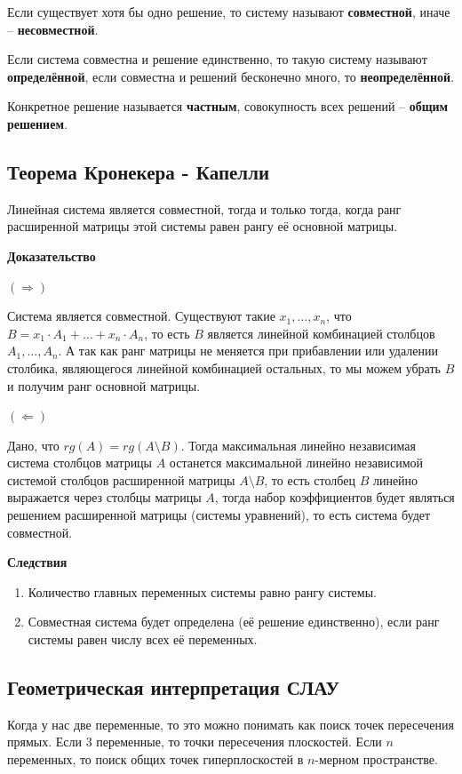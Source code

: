\documentclass{article}
\begin{document}
Если существует хотя бы одно решение, то систему называют \textbf{совместной}, иначе -- \textbf{несовместной}.

Если система совместна и решение единственно, то такую систему называют \textbf{определённой}, если совместна и решений бесконечно много, то \textbf{неопределённой}.

Конкретное решение называется \textbf{частным}, совокупность всех решений -- \textbf{общим решением}.
\newpage
\subsection{Теорема Кронекера - Капелли}
Линейная система является совместной, тогда и только тогда, когда ранг расширенной матрицы этой системы равен рангу её основной матрицы.

\textbf{Доказательство}

$(\Rightarrow)$

Система является совместной. Существуют такие $x_1,\ldots,x_n$, что $B=x_1\cdot A_1+\ldots+x_n\cdot A_n$, то есть $B$ является линейной комбинацией столбцов $A_1,\ldots,A_n$. А так как ранг матрицы не меняется при прибавлении или удалении столбика, являющегося линейной комбинацией остальных, то мы можем убрать $B$ и получим ранг основной матрицы.

$(\Leftarrow)$

Дано, что $rg(A)=rg(A\setminus B)$. Тогда максимальная линейно независимая система столбцов матрицы $A$ останется максимальной линейно независимой системой столбцов расширенной матрицы $A\setminus B$, то есть столбец $B$ линейно выражается через столбцы матрицы $A$, тогда набор коэффициентов будет являться решением расширенной матрицы (системы уравнений), то есть система будет совместной.

\textbf{Следствия}

\begin{enumerate}
    \item Количество главных переменных системы равно рангу системы.
    \item Совместная система будет определена (её решение единственно), если ранг системы равен числу всех её переменных.
\end{enumerate}

\subsection{Геометрическая интерпретация СЛАУ}
Когда у нас две переменные, то это можно понимать как поиск точек пересечения прямых. Если $3$ переменные, то точки пересечения плоскостей. Если $n$ переменных, то поиск общих точек гиперплоскостей в $n$-мерном пространстве.
\end{document}
